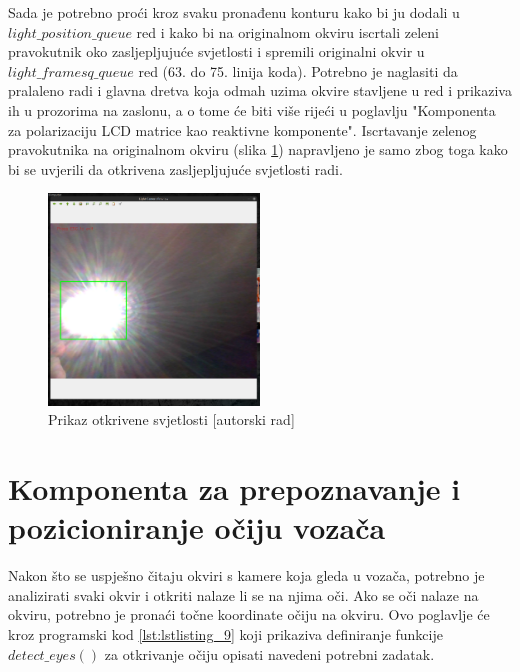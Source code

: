 \documentclass{foi}
\begin{document}
Sada je potrebno proći kroz svaku pronađenu konturu kako bi ju dodali u $light\_position\_queue$ red i kako bi na originalnom okviru iscrtali zeleni pravokutnik oko zasljepljujuće svjetlosti i spremili originalni okvir u $light\_framesq\_queue$ red (63. do 75. linija koda). Potrebno je naglasiti da pralaleno radi i glavna dretva koja odmah uzima okvire stavljene u red i prikaziva ih u prozorima na zaslonu, a o tome će biti više rijeći u poglavlju "Komponenta za polarizaciju LCD matrice kao reaktivne komponente". Iscrtavanje zelenog pravokutnika na originalnom okviru (slika \ref{fig:sustav2}) napravljeno je samo zbog toga kako bi se uvjerili da otkrivena zasljepljujuće svjetlosti radi.

\begin{figure}[h!]
    \centering
    \includegraphics[width=0.5\textwidth]{slike/sustav2}
    \caption{Prikaz otkrivene svjetlosti [autorski rad]}
    \label{fig:sustav2}
\end{figure}

\pagebreak
\section{Komponenta za prepoznavanje i pozicioniranje očiju vozača}

Nakon što se uspješno čitaju okviri s kamere koja gleda u vozača, potrebno je analizirati svaki okvir i otkriti nalaze li se na njima oči. Ako se oči nalaze na okviru, potrebno je pronaći točne koordinate očiju na okviru. Ovo poglavlje će kroz programski kod \ref{lst:lstlisting_9} koji prikaziva definiranje funkcije $detect\_eyes()$ za otkrivanje očiju opisati navedeni potrebni zadatak.
\end{document}
